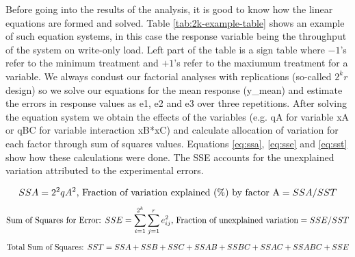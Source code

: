 \documentclass[11pt,a4paper]{article}
\begin{document}
\par Before going into the results of the analysis, it is good to know how the linear equations are formed and solved. Table \ref{tab:2k-example-table} shows an example of such equation systems, in this case the response variable being the throughput of the system on write-only load. Left part of the table is a sign table where $-1$'s refer to the minimum treatment and $+1$'s refer to the maxiumum treatment for a variable. We always condust our factorial analyses with replications (so-called $2^{k}r$ design) so we solve our equations for the mean response (y\_mean) and estimate the errors in response values as e1, e2 and e3 over three repetitions. After solving the equation system we obtain the effects of the variables (e.g. qA for variable xA or qBC for variable interaction xB*xC) and calculate allocation of variation for each factor through sum of squares values. Equations \ref{eq:ssa}, \ref{eq:sse} and \ref{eq:sst} show how these calculations were done. The SSE accounts for the unexplained variation attributed to the experimental errors.
\begin{small}
\begin{equation} \label{eq:ssa}
SSA = 2^2 qA^2 \textnormal{, Fraction of variation explained (\%) by factor A} = SSA / SST
\end{equation}
\begin{equation} \label{eq:sse}
\textnormal{Sum of Squares for Error: } SSE = \sum_{i=1}^{2^{k}}\sum_{j=1}^{r} e_{ij}^{2} \textnormal{, Fraction of unexplained variation} = SSE / SST
\end{equation}
\begin{equation} \label{eq:sst}
\textnormal{Total Sum of Squares: } SST = SSA + SSB + SSC + SSAB + SSBC + SSAC + SSABC + SSE
\end{equation}
\end{small}
\end{document}
